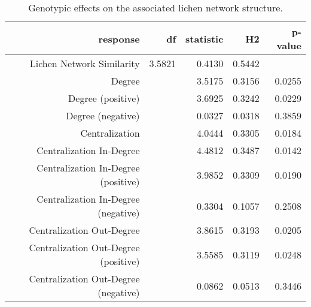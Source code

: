 \begin{table}[ht]
\centering
\begin{tabular}{rrrrr}
  \hline
response & df & statistic & H2 & p-value \\ 
  \hline
Lichen Network Similarity & 3.5821 & 0.4130 & 0.5442 &  \\ 
  Degree &  & 3.5175 & 0.3156 & 0.0255 \\ 
  Degree (positive) &  & 3.6925 & 0.3242 & 0.0229 \\ 
  Degree (negative) &  & 0.0327 & 0.0318 & 0.3859 \\ 
  Centralization &  & 4.0444 & 0.3305 & 0.0184 \\ 
  Centralization In-Degree &  & 4.4812 & 0.3487 & 0.0142 \\ 
  Centralization In-Degree (positive) &  & 3.9852 & 0.3309 & 0.0190 \\ 
  Centralization In-Degree (negative) &  & 0.3304 & 0.1057 & 0.2508 \\ 
  Centralization Out-Degree &  & 3.8615 & 0.3193 & 0.0205 \\ 
  Centralization Out-Degree (positive) &  & 3.5585 & 0.3119 & 0.0248 \\ 
  Centralization Out-Degree (negative) &  & 0.0862 & 0.0513 & 0.3446 \\ 
   \hline
\end{tabular}
\caption{Genotypic effects on the associated lichen network structure.} 
\label{tab:h2_net}
\end{table}
